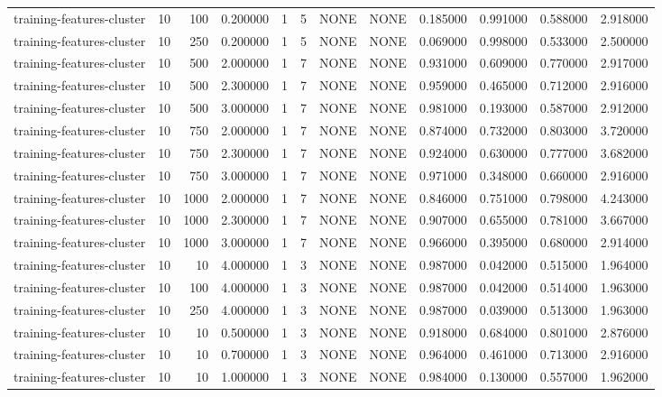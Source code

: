 \begin{tabular}{lrrrllllrrrr}
training-features-cluster & 10 & 100 & 0.200000 & 1 & 5 & NONE & NONE & 0.185000 & 0.991000 & 0.588000 & 2.918000 \\
training-features-cluster & 10 & 250 & 0.200000 & 1 & 5 & NONE & NONE & 0.069000 & 0.998000 & 0.533000 & 2.500000 \\
training-features-cluster & 10 & 500 & 2.000000 & 1 & 7 & NONE & NONE & 0.931000 & 0.609000 & 0.770000 & 2.917000 \\
training-features-cluster & 10 & 500 & 2.300000 & 1 & 7 & NONE & NONE & 0.959000 & 0.465000 & 0.712000 & 2.916000 \\
training-features-cluster & 10 & 500 & 3.000000 & 1 & 7 & NONE & NONE & 0.981000 & 0.193000 & 0.587000 & 2.912000 \\
training-features-cluster & 10 & 750 & 2.000000 & 1 & 7 & NONE & NONE & 0.874000 & 0.732000 & 0.803000 & 3.720000 \\
training-features-cluster & 10 & 750 & 2.300000 & 1 & 7 & NONE & NONE & 0.924000 & 0.630000 & 0.777000 & 3.682000 \\
training-features-cluster & 10 & 750 & 3.000000 & 1 & 7 & NONE & NONE & 0.971000 & 0.348000 & 0.660000 & 2.916000 \\
training-features-cluster & 10 & 1000 & 2.000000 & 1 & 7 & NONE & NONE & 0.846000 & 0.751000 & 0.798000 & 4.243000 \\
training-features-cluster & 10 & 1000 & 2.300000 & 1 & 7 & NONE & NONE & 0.907000 & 0.655000 & 0.781000 & 3.667000 \\
training-features-cluster & 10 & 1000 & 3.000000 & 1 & 7 & NONE & NONE & 0.966000 & 0.395000 & 0.680000 & 2.914000 \\
training-features-cluster & 10 & 10 & 4.000000 & 1 & 3 & NONE & NONE & 0.987000 & 0.042000 & 0.515000 & 1.964000 \\
training-features-cluster & 10 & 100 & 4.000000 & 1 & 3 & NONE & NONE & 0.987000 & 0.042000 & 0.514000 & 1.963000 \\
training-features-cluster & 10 & 250 & 4.000000 & 1 & 3 & NONE & NONE & 0.987000 & 0.039000 & 0.513000 & 1.963000 \\
training-features-cluster & 10 & 10 & 0.500000 & 1 & 3 & NONE & NONE & 0.918000 & 0.684000 & 0.801000 & 2.876000 \\
training-features-cluster & 10 & 10 & 0.700000 & 1 & 3 & NONE & NONE & 0.964000 & 0.461000 & 0.713000 & 2.916000 \\
training-features-cluster & 10 & 10 & 1.000000 & 1 & 3 & NONE & NONE & 0.984000 & 0.130000 & 0.557000 & 1.962000 \\

\end{tabular}
